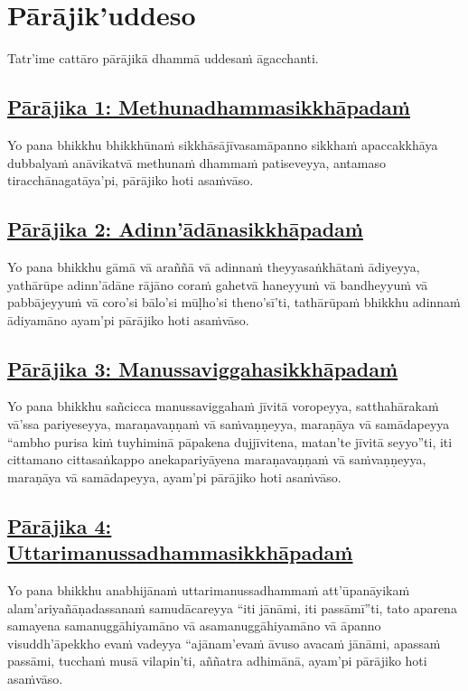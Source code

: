 \section{Pārājik'uddeso}
\label{par}

\begin{intro}
  Tatr'ime cattāro pārājikā dhammā uddesaṁ āgacchanti.
\end{intro}

\setsubsecheadstyle{\subsubsectionFmt}
\subsection*{\hyperref[disq1]{Pārājika 1: Methunadhammasikkhāpadaṁ}}
\label{par1}
Yo pana bhikkhu bhikkhūnaṁ sikkhāsājīvasamāpanno sikkhaṁ apaccakkhāya dubbalyaṁ anāvikatvā methunaṁ dhammaṁ patiseveyya, antamaso tiracchānagatāya'pi, pārājiko hoti asaṁvāso.

\subsection*{\hyperref[disq2]{Pārājika 2: Adinn'ādānasikkhāpadaṁ}}
\label{par2}
Yo pana bhikkhu gāmā vā araññā vā adinnaṁ theyyasaṅkhātaṁ ādiyeyya, yathārūpe adinn'ādāne rājāno coraṁ gahetvā haneyyuṁ vā bandheyyuṁ vā pabbājeyyuṁ vā coro'si bālo'si mūḷho'si theno'sī'ti, tathārūpaṁ bhikkhu adinnaṁ ādiyamāno ayam'pi pārājiko hoti asaṁvāso.

\subsection*{\hyperref[disq3]{Pārājika 3: Manussaviggahasikkhāpadaṁ}}
\label{par3}
Yo pana bhikkhu sañcicca manussaviggahaṁ jīvitā voropeyya, satthahārakaṁ vā'ssa pariyeseyya, maraṇavaṇṇaṁ vā saṁvaṇṇeyya, maraṇāya vā samādapeyya “ambho purisa kiṁ tuyhiminā pāpakena dujjīvitena, matan'te jīvitā seyyo”ti, iti cittamano cittasaṅkappo anekapariyāyena maraṇavaṇṇaṁ vā saṁvaṇṇeyya, maraṇāya vā samādapeyya, ayam'pi pārājiko hoti asaṁvāso.

\subsection*{\hyperref[disq4]{Pārājika 4: Uttarimanussadhammasikkhāpadaṁ}}
\label{par4}
Yo pana bhikkhu anabhijānaṁ uttarimanussadhammaṁ att'ūpanāyikaṁ alam'ariyañāṇadassanaṁ samudācareyya “iti jānāmi, iti passāmī”ti, tato aparena samayena samanuggāhiyamāno vā asamanuggāhiyamāno vā āpanno visuddh'āpekkho evaṁ vadeyya “ajānam'evaṁ āvuso avacaṁ jānāmi, apassaṁ passāmi, tucchaṁ musā vilapin'ti, aññatra adhimānā, ayam'pi pārājiko hoti asaṁvāso.

